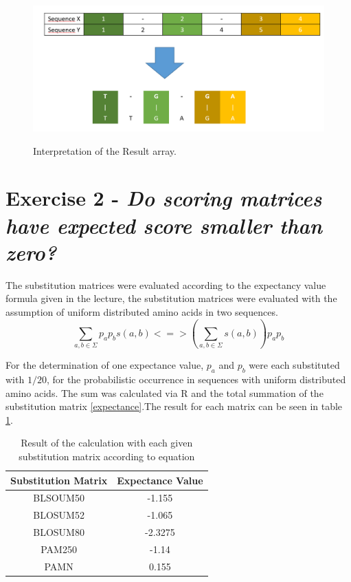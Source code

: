 \documentclass[%
   10pt,              %
   nenglish,           %
   a4paper,           %
   DIV11,             %
]{scrartcl}%
\begin{document}
  \begin{figure}[h]
   \includegraphics[scale=0.25]{img/Hirschberg_Step4.png}
   \label{Step4}
   \caption{Interpretation of the Result array.}
   \end{figure}
   
   
   
 \section*{Exercise 2 - \textsl{Do scoring matrices have expected score smaller than zero?}}
 
 The substitution matrices were evaluated according to the expectancy value formula given in the lecture, the substitution matrices were evaluated with the assumption of uniform distributed amino acids in two sequences.
 \begin{equation*}
 \sum_{a,b \in \Sigma}p_a p_b s(a,b)
 <=>  (\sum_{a,b \in \Sigma} s(a,b))  p_a p_b
 \label{expectance}
 \end{equation*}
 
 For the determination of one expectance value, $p_a$ and $p_b$ were each substituted with $1/20$, for the probabilistic occurrence in sequences with uniform distributed amino acids. The sum was calculated via R and the total summation of the substitution matrix \ref{expectance}.The result for each matrix can be seen in table \ref{Results-Expectance}.
 
 \begin{table}[h]
 \begin{tabular}{|c|c|}
 	\hline \rule[-2ex]{0pt}{5.5ex} Substitution Matrix & Expectance Value \\ 
 	\hline \rule[-2ex]{0pt}{5.5ex} BLSOUM50 & -1.155 \\ 
 	\hline \rule[-2ex]{0pt}{5.5ex} BLOSUM52 & -1.065 \\ 
 	\hline \rule[-2ex]{0pt}{5.5ex} BLOSUM80 & -2.3275 \\ 
 	\hline \rule[-2ex]{0pt}{5.5ex} PAM250 & -1.14 \\ 
 	\hline \rule[-2ex]{0pt}{5.5ex} PAMN & 0.155 \\ 
 	\hline 
 \end{tabular} 
 
   	\label{Results-Expectance}
   	\caption{Result of the calculation with each given substitution matrix according to equation}
 \end{table}
 
\end{document}
